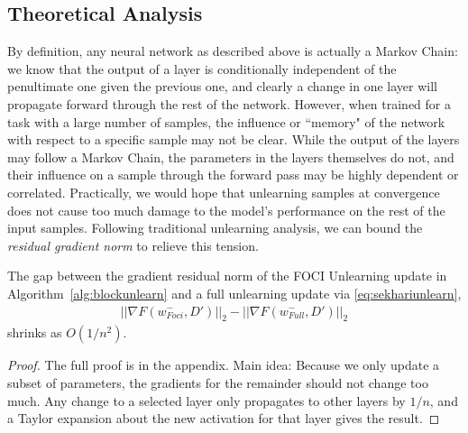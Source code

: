 \subsection{Theoretical Analysis}
By definition, any neural network as described above is actually a Markov Chain: we know that the output of a layer is conditionally independent of the penultimate one given the previous one, and clearly a change in one layer will propagate forward through the rest of the network.
However, when trained for a task with a large number of samples, the influence or ``memory" of the network with respect to a specific sample may not be clear.
While the output of the layers may follow a Markov Chain, the parameters in the layers themselves do not, and their influence on a sample through the forward pass may be highly dependent or correlated.
Practically, we would hope that unlearning samples at convergence does not cause too much damage to the model's performance on the rest of the input samples.
Following traditional unlearning analysis, we can bound the \textit{residual gradient norm} to relieve this tension.
\begin{lemma}
The gap between the gradient residual norm of the FOCI Unlearning update in Algorithm~\ref{alg:blockunlearn} and a full unlearning update via \eqref{eq:sekhariunlearn},
\begin{align}
||\nabla F(w^-_{Foci},D')||_2 - ||\nabla F(w^-_{Full},D')||_2
\end{align}
shrinks as $O(1/n^2)$.
\end{lemma}
\begin{proof}
The full proof is in the appendix. Main idea: Because we only update a subset of parameters, the gradients for the remainder should not change too much. Any change to a selected layer only propagates to other layers by $1/n$, and a Taylor expansion about the new activation for that layer gives the result.
\end{proof}


